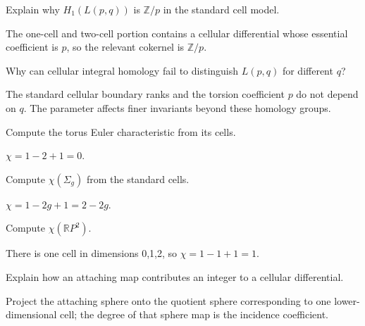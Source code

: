 \begin{problem}\label{prob:viii18-14}
Explain why \(H_1(L(p,q))\) is \(\mathbb Z/p\) in the standard cell model.
\end{problem}
\begin{solution}
The one-cell and two-cell portion contains a cellular differential whose essential coefficient is \(p\), so the relevant cokernel is \(\mathbb Z/p\).
\end{solution}

\begin{problem}\label{prob:viii18-15}
Why can cellular integral homology fail to distinguish \(L(p,q)\) for different \(q\)?
\end{problem}
\begin{solution}
The standard cellular boundary ranks and the torsion coefficient \(p\) do not depend on \(q\). The parameter affects finer invariants beyond these homology groups.
\end{solution}

\begin{problem}\label{prob:viii18-16}
Compute the torus Euler characteristic from its cells.
\end{problem}
\begin{solution}
\(\chi=1-2+1=0\).
\end{solution}

\begin{problem}\label{prob:viii18-17}
Compute \(\chi(\Sigma_g)\) from the standard cells.
\end{problem}
\begin{solution}
\(\chi=1-2g+1=2-2g\).
\end{solution}

\begin{problem}\label{prob:viii18-18}
Compute \(\chi(\mathbb RP^2)\).
\end{problem}
\begin{solution}
There is one cell in dimensions 0,1,2, so \(\chi=1-1+1=1\).
\end{solution}

\begin{problem}\label{prob:viii18-19}
Explain how an attaching map contributes an integer to a cellular differential.
\end{problem}
\begin{solution}
Project the attaching sphere onto the quotient sphere corresponding to one lower-dimensional cell; the degree of that sphere map is the incidence coefficient.
\end{solution}

